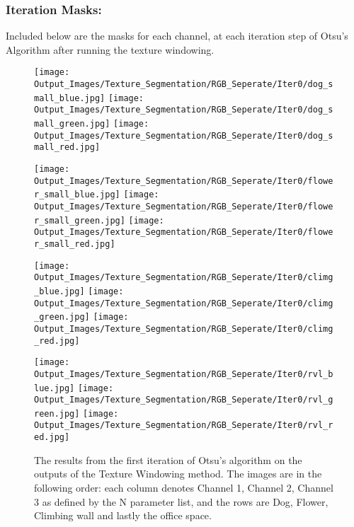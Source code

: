 \documentclass{article}
\begin{document}
\subsubsection{Iteration Masks:}
Included below are the masks for each channel, at each iteration step of Otsu's Algorithm after running the texture windowing.
\begin{figure}[H]
    \centering
    \texttt{[image: Output\_Images/Texture\_Segmentation/RGB\_Seperate/Iter0/dog\_small\_blue.jpg]}
    \texttt{[image: Output\_Images/Texture\_Segmentation/RGB\_Seperate/Iter0/dog\_small\_green.jpg]}
    \texttt{[image: Output\_Images/Texture\_Segmentation/RGB\_Seperate/Iter0/dog\_small\_red.jpg]}

    \texttt{[image: Output\_Images/Texture\_Segmentation/RGB\_Seperate/Iter0/flower\_small\_blue.jpg]}
    \texttt{[image: Output\_Images/Texture\_Segmentation/RGB\_Seperate/Iter0/flower\_small\_green.jpg]}
    \texttt{[image: Output\_Images/Texture\_Segmentation/RGB\_Seperate/Iter0/flower\_small\_red.jpg]}

    \texttt{[image: Output\_Images/Texture\_Segmentation/RGB\_Seperate/Iter0/climg\_blue.jpg]}
    \texttt{[image: Output\_Images/Texture\_Segmentation/RGB\_Seperate/Iter0/climg\_green.jpg]}
    \texttt{[image: Output\_Images/Texture\_Segmentation/RGB\_Seperate/Iter0/climg\_red.jpg]}

    \texttt{[image: Output\_Images/Texture\_Segmentation/RGB\_Seperate/Iter0/rvl\_blue.jpg]}
    \texttt{[image: Output\_Images/Texture\_Segmentation/RGB\_Seperate/Iter0/rvl\_green.jpg]}
    \texttt{[image: Output\_Images/Texture\_Segmentation/RGB\_Seperate/Iter0/rvl\_red.jpg]}
    \caption{The results from the first iteration of Otsu's algorithm on the outputs of the Texture Windowing method. 
    The images are in the following order: each column denotes Channel 1, Channel 2, Channel 3 as defined by the N parameter list,
    and the rows are Dog, Flower, Climbing wall and lastly the office space.}
\end{figure}
\end{document}
